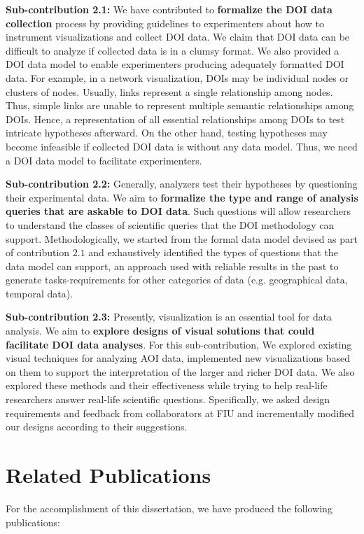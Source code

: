 \textbf{Sub-contribution 2.1:} We have contributed to \textbf{formalize the DOI data collection} process by providing guidelines to experimenters about how to instrument visualizations and collect DOI data. We claim that DOI data can be difficult to analyze if collected data is in a clumsy format. We also provided a DOI data model to enable experimenters producing adequately formatted DOI data. For example, in a network visualization, DOIs may be individual nodes or clusters of nodes. Usually,  links represent a single relationship among nodes. Thus, simple links are unable to represent multiple semantic relationships among DOIs. Hence, a representation of all essential relationships among DOIs to test intricate hypotheses afterward. On the other hand, testing hypotheses may become infeasible if collected DOI data is without any data model. Thus, we need a DOI data model to facilitate experimenters. 

\textbf{Sub-contribution 2.2:} Generally, analyzers test their hypotheses by questioning their experimental data. We aim to \textbf{formalize the type and range of analysis queries that are askable to DOI data}. Such questions will allow researchers to understand the classes of scientific queries that the DOI methodology can support. Methodologically, we started from the formal data model devised as part of contribution $2.1$ and exhaustively identified the types of questions that the data model can support, an approach used with reliable results in the past to generate tasks-requirements for other categories of data (e.g. geographical data, temporal data). 

\textbf{Sub-contribution 2.3:} Presently, visualization is an essential tool for data analysis. We aim to \textbf{explore designs of visual solutions that could facilitate DOI data analyses}. For this sub-contribution, We explored existing visual techniques for analyzing AOI data, implemented new visualizations based on them to support the interpretation of the larger and richer DOI data. We also explored these methods and their effectiveness while trying to help real-life researchers answer real-life scientific questions. Specifically, we asked design requirements and feedback from collaborators at FIU and incrementally modified our designs according to their suggestions. 

\section{Related Publications}
For the accomplishment of this dissertation, we have produced the following publications:

